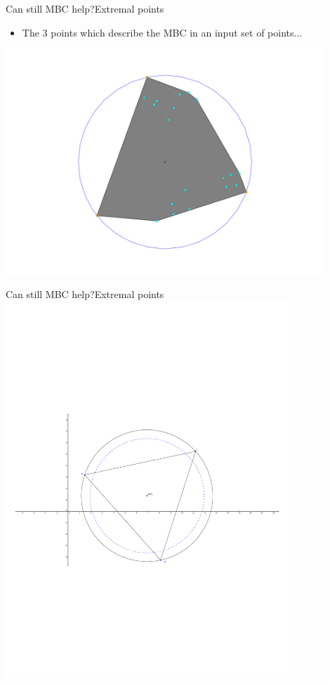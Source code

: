 \documentclass{beamer}
\begin{document}
\begin{frame}{Can still MBC help?}{Extremal points}
    \begin{itemize}
        \item The 3 points which describe the MBC in an input set of points...
    \end{itemize}
    \includegraphics[width=0.9\textwidth]{figures/Extremal_4}
\end{frame}

\begin{frame}{Can still MBC help?}{Extremal points}
    \centering
    \includegraphics[trim=2cm 8cm 2cm 8cm,clip,width=0.8\textwidth]{figures/MBCs}
\end{frame}
\end{document}
